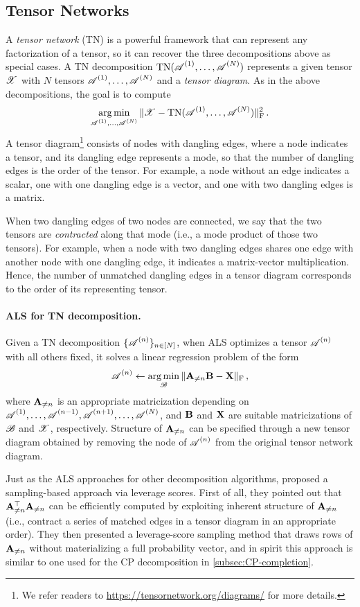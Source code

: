 \subsection{Tensor Networks}
\label{app:tensor-networks}

A \emph{tensor network} (TN) is a powerful framework that can represent any factorization of a tensor,
so it can recover the three decompositions above as special cases.
A TN decomposition $\text{TN}(\bm{\mathscr{A}}^{(1)},\dots,\bm{\mathscr{A}}^{(N)})$ represents a given tensor $\bm{\mathscr{X}}$ with $N$ tensors $\bm{\mathscr{A}}^{(1)},\dots, \bm{\mathscr{A}}^{(N)}$ and a \emph{tensor diagram}. As in the above decompositions, the goal is to compute
\[
\operatorname*{arg\,min}_{\bm{\mathscr{A}}^{(1)},\dots,\bm{\mathscr{A}}^{(N)}}\,\lVert\bm{\mathscr{X}} - \text{TN}(\bm{\mathscr{A}}^{(1)},\dots,\bm{\mathscr{A}}^{(N)})\rVert_{\textnormal{F}}^2\,.
\]
A tensor diagram\footnote{We refer readers to \url{https://tensornetwork.org/diagrams/} for more details.} consists of nodes with dangling edges, where a node indicates a tensor, and its dangling edge represents a mode, so that the number of dangling edges is the order of the tensor. For example, a node without an edge indicates a scalar, one with one dangling edge is a vector, and one with two dangling edges is a matrix.

When two dangling edges of two nodes are connected, we say that the two tensors are \emph{contracted} along that mode (i.e., a mode product of those two tensors). For example, when a node with two dangling edges shares one edge with another node with one dangling edge, it indicates a matrix-vector multiplication. Hence, the number of unmatched dangling edges in a tensor diagram corresponds to the order of its representing tensor.

\paragraph{ALS for TN decomposition.}
Given a TN decomposition $\{\bm{\mathscr{A}}^{(n)}\}_{n\in[N]}$, when ALS optimizes a tensor $\bm{\mathscr{A}}^{(n)}$ with all others fixed, it solves a linear regression problem of the form
\[
\bm{\mathscr{A}}^{(n)} \gets \operatorname*{arg\,min}_{\bm{\mathscr{B}}} \, \lVert \mathbf{A}_{\neq n}\mathbf{B} - \mathbf{X}\rVert_{\textnormal{F}}\,,
\]
where $\mathbf{A}_{\neq n}$ is an appropriate matricization depending on $\bm{\mathscr{A}}^{(1)},\dots,\bm{\mathscr{A}}^{(n-1)}, \bm{\mathscr{A}}^{(n+1)},\dots,\bm{\mathscr{A}}^{(N)}$, and $\mathbf{B}$ and $\mathbf{X}$ are suitable matricizations of $\bm{\mathscr{B}}$ and $\bm{\mathscr{X}}$, respectively. Structure of $\mathbf{A}_{\neq n}$ can be specified through a new tensor diagram obtained by removing the node of $\bm{\mathscr{A}}^{(n)}$ from the original tensor network diagram.

Just as the ALS approaches for other decomposition algorithms, \citet{malik2022sampling} proposed a sampling-based approach via leverage scores. First of all, they pointed out that $\mathbf{A}_{\neq n}^\top \mathbf{A}_{\neq n}$ can be efficiently computed by exploiting inherent structure of $\mathbf{A}_{\neq n}$ (i.e., contract a series of matched edges in a tensor diagram in an appropriate order). They then presented a leverage-score sampling method that draws rows of $\mathbf{A}_{\neq n}$ without materializing a full probability vector, and in spirit this approach is similar to one used for the CP decomposition in \cref{subsec:CP-completion}.

